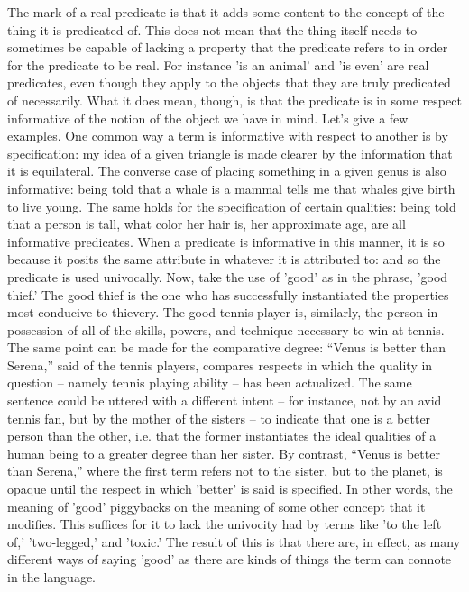 \documentclass[]{article}
\begin{document}
The mark of a real predicate is that it adds some content to the concept of the thing it is predicated of.   This does not mean that the thing itself needs to sometimes be capable of lacking a property that the predicate refers to in order for the predicate to be real. For instance 'is an animal' and 'is even' are real predicates, even though they apply to the objects that they are truly predicated of necessarily. What it does mean, though, is that the predicate is in some respect informative  of the notion of the object we have in mind.
Let’s give a few examples. One common way a term is informative with respect to another is by specification: my idea of a given triangle is made clearer by the information that it is equilateral. The converse case of placing something in a given genus is also informative: being told that a whale is a mammal tells me that whales give birth to live young. The same holds for the specification of certain qualities: being told that a person is tall, what color her hair is, her approximate age, are all informative predicates.
When a predicate is informative in this manner, it is so because it posits the same attribute in whatever it is attributed to: and so the predicate is used univocally. 
Now, take the use of 'good' as in the phrase, 'good thief.' The good thief is the one who has successfully instantiated the properties most conducive to thievery. The good tennis player is, similarly, the person in possession of all of the skills, powers, and technique necessary to win at tennis. The same point can be made for the comparative degree: “Venus is better than Serena,” said of the tennis players, compares respects in which the quality in question – namely tennis playing ability – has been actualized. The same sentence could be uttered with a different intent – for instance, not by an avid tennis fan, but by the mother of the sisters – to indicate that one is a better person than the other, i.e. that the former instantiates the ideal qualities of a human being to a greater degree than her sister. By contrast, “Venus is better than Serena,” where the first term refers not to the sister, but to the planet, is opaque until the respect in which 'better' is said is specified. 
In other words, the meaning of 'good' piggybacks on the meaning of some other concept that it modifies. This suffices for it to lack the univocity had by terms like 'to the left of,' 'two-legged,' and 'toxic.' The result of this is that there are, in effect, as many different ways of saying 'good' as there are kinds of things the term can connote in the language.  
\end{document}
